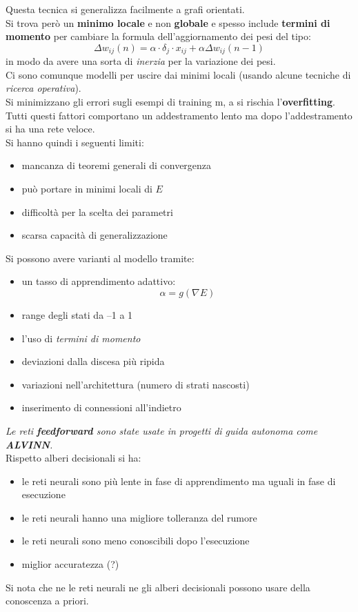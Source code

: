 							Questa tecnica si generalizza facilmente a grafi orientati.\\  
							Si trova però un \textbf{minimo locale} e non \textbf{globale} e spesso
							include \textbf{termini di momento} per cambiare la formula dell'aggiornamento
							dei pesi del tipo: 
							\[\Delta w_{ij}(n)=\alpha\cdot \delta_j\cdot x_{ij}+\alpha\Delta w_{ij}(n-1)\]
							in modo da avere una sorta di \textit{inerzia} per la variazione dei pesi.\\
							Ci sono comunque modelli per uscire dai minimi locali (usando alcune tecniche di
							\textit{ricerca operativa}).\\
							Si minimizzano gli errori sugli esempi di training m, a si rischia
							l'\textbf{overfitting}.\\
							Tutti questi fattori comportano un addestramento lento ma dopo l'addestramento
							si ha una rete veloce.\\
							Si hanno quindi i seguenti limiti:
							\begin{itemize}
								\item mancanza di teoremi generali di convergenza
								\item può portare in minimi locali di $E$ 
								\item difficoltà per la scelta dei parametri 
								\item scarsa capacità di generalizzazione 
							\end{itemize}
							Si possono avere varianti al modello tramite:
							\begin{itemize}
								\item un tasso di apprendimento adattivo:
								      \[\alpha=g(\nabla E)\]
								\item range degli stati da –1 a 1 
								\item l'uso di \textit{termini di momento}
								\item deviazioni dalla discesa più ripida 
								\item variazioni nell'architettura (numero di strati nascosti)
								\item inserimento di connessioni all'indietro
							\end{itemize}
							\textit{Le reti \textbf{feedforward} sono state usate in progetti di guida
								autonoma come \textbf{ALVINN}.}\\
							Rispetto alberi decisionali si ha:
							\begin{itemize}
								\item le reti neurali sono più lente in fase di apprendimento ma uguali in
								      fase di esecuzione
								\item le reti neurali hanno una migliore tolleranza del rumore
								\item le reti neurali sono meno conoscibili dopo l'esecuzione
								\item miglior accuratezza (?)
							\end{itemize}
							Si nota che ne le reti neurali ne gli alberi decisionali possono usare della
							conoscenza a priori.
